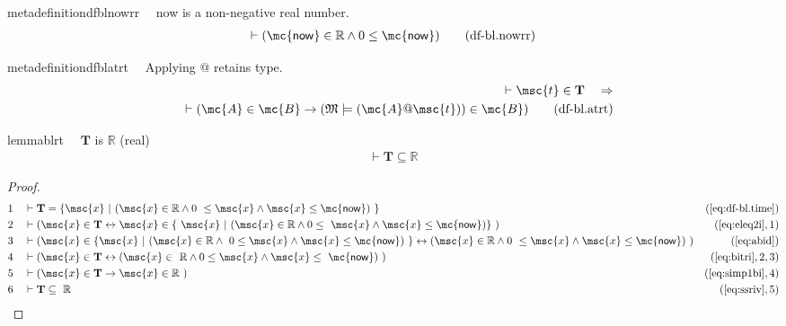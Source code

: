 \begin{restatable}{metadefinition}{dfblnowrr}~~ now is a non-negative real number.
\begin{align}
\vdash ( \mathsf{\mc{now}} \in \mathbb{R} \wedge 0 \le \mathsf{\mc{now}}
    )\label{eq:df-bl.nowrr}\tag{df-bl.nowrr}
\end{align}
\end{restatable}

\begin{restatable}{metadefinition}{dfblatrt}~~ Applying @ retains type.
\begin{align}
\vdash \msc{t} \in \mathbf{T}\quad\Rightarrow \notag \\ 
	\quad \vdash ( \mc{A} \in \mc{B}
    \rightarrow ( \mathfrak{M} \models ( \mc{A} @ \msc{t} ) ) \in \mc{B}
    )\label{eq:df-bl.atrt}\tag{df-bl.atrt}
\end{align}
\end{restatable}

\begin{restatable}{lemma}{blrt}~~ $\mathbf{T}$ is $\mathbb{R}$ (real)
\begin{align}
\vdash \mathbf{T} \subseteq \mathbb{R}\label{eq:bl.rt}\tag{bl.rt}
\end{align}
\end{restatable}

\begin{proof}
\begin{align}
  1 &&  & \vdash \mathbf{T} = \{ \msc{x}~\vert~( \msc{x} \in \mathbb{R} \wedge 0
     ~\le \msc{x} \wedge \msc{x} \le \mathsf{\mc{now}} )
     ~\}&(\mbox{\ref{eq:df-bl.time}})\notag
  \\ 2 &&  & \vdash ( \msc{x} \in \mathbf{T} \leftrightarrow \msc{x} \in \{
     ~\msc{x}~\vert~( \msc{x} \in \mathbb{R} \wedge 0 \le
     ~\msc{x} \wedge \msc{x} \le \mathsf{\mc{now}} ) \}
     ~)&(\mbox{\ref{eq:eleq2i}},1)\notag
  \\ 3 &&  & \vdash ( \msc{x} \in \{ \msc{x}~\vert~( \msc{x} \in \mathbb{R} \wedge
     ~0 \le \msc{x} \wedge \msc{x} \le \mathsf{\mc{now}} )
     ~\} \leftrightarrow ( \msc{x} \in \mathbb{R} \wedge 0
     ~\le \msc{x} \wedge \msc{x} \le \mathsf{\mc{now}} )
     ~)&(\mbox{\ref{eq:abid}})\notag
  \\ 4 &&  & \vdash ( \msc{x} \in \mathbf{T} \leftrightarrow ( \msc{x} \in
     ~\mathbb{R} \wedge 0 \le \msc{x} \wedge \msc{x} \le
     ~\mathsf{\mc{now}} )
     ~)&(\mbox{\ref{eq:bitri}},2,3)\notag
  \\ 5 &&  & \vdash ( \msc{x} \in \mathbf{T} \rightarrow \msc{x} \in \mathbb{R}
     ~)&(\mbox{\ref{eq:simp1bi}},4)\notag
  \\ 6 &&  & \vdash \mathbf{T} \subseteq
     ~\mathbb{R}&(\mbox{\ref{eq:ssriv}},5)\notag
\end{align}
\end{proof}


